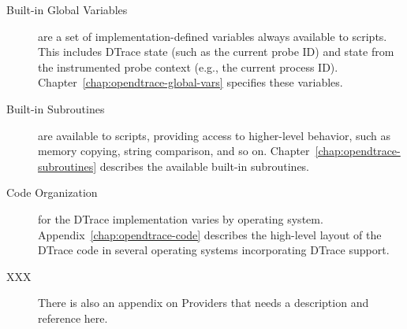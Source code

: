 \begin{description}
\item[Built-in Global Variables] are a set of implementation-defined
  variables always available to scripts.
  This includes DTrace state (such as the current probe ID) and state from the
  instrumented probe context (e.g., the current process ID).
  Chapter~\ref{chap:opendtrace-global-vars} specifies these variables.

\item[Built-in Subroutines] are available to scripts, providing access to
  higher-level behavior, such as memory copying, string comparison, and so on.
  Chapter~\ref{chap:opendtrace-subroutines} describes the available built-in
  subroutines.

\item[Code Organization] for the DTrace implementation varies by operating
  system.
  Appendix~\ref{chap:opendtrace-code} describes the high-level layout of the
  DTrace code in several operating systems incorporating DTrace support.

\item[XXX] There is also an appendix on Providers that needs a description
  and reference here.

\end{description}
